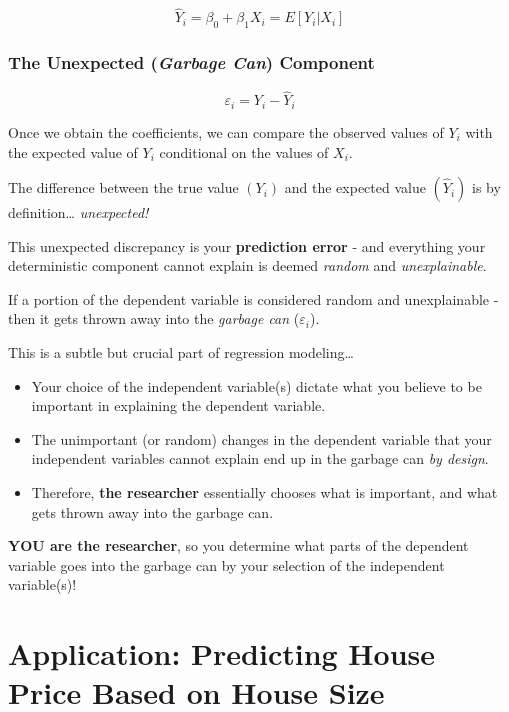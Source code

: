 \documentclass[
]{book}
\begin{document}
\[\hat{Y}_i=\beta_0+\beta_1X_i=E[Y_i|X_i]\]

\hypertarget{the-unexpected-garbage-can-component}{%
\subsubsection*{\texorpdfstring{The Unexpected (\emph{Garbage Can}) Component}{The Unexpected (Garbage Can) Component}}\label{the-unexpected-garbage-can-component}}

\[\varepsilon_i=Y_i-\hat{Y}_i\]

Once we obtain the coefficients, we can compare the observed values of \(Y_i\) with the expected value of \(Y_i\) conditional on the values of \(X_i\).

The difference between the true value \((Y_i)\) and the expected value \((\hat{Y}_i)\) is by definition\ldots{} \emph{unexpected!}

This unexpected discrepancy is your \textbf{prediction error} - and everything your deterministic component cannot explain is deemed \emph{random} and \emph{unexplainable}.

If a portion of the dependent variable is considered random and unexplainable - then it gets thrown away into the \emph{garbage can} (\(\varepsilon_i\)).

This is a subtle but crucial part of regression modeling\ldots{}

\begin{itemize}
\item
  Your choice of the independent variable(s) dictate what you believe to be important in explaining the dependent variable.
\item
  The unimportant (or random) changes in the dependent variable that your independent variables cannot explain end up in the garbage can \emph{by design}.
\item
  Therefore, \textbf{the researcher} essentially chooses what is important, and what gets thrown away into the garbage can.
\end{itemize}

\textbf{YOU are the researcher}, so you determine what parts of the dependent variable goes into the garbage can by your selection of the independent variable(s)!

\hypertarget{application-predicting-house-price-based-on-house-size}{%
\section{Application: Predicting House Price Based on House Size}\label{application-predicting-house-price-based-on-house-size}}
\end{document}
